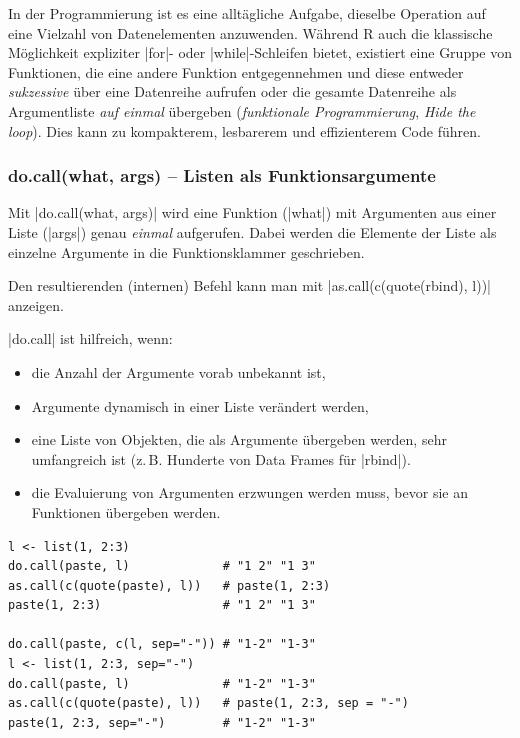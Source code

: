 \documentclass[10pt,twocolumn]{scrartcl}
\renewcommand{\lstinline}{\mycoloredinline}
\begin{document}
In der Programmierung ist es eine alltägliche Aufgabe, dieselbe Operation auf eine Vielzahl von Datenelementen anzuwenden. Während R auch die klassische Möglichkeit expliziter \lstinline|for|- oder \lstinline|while|-Schleifen bietet, existiert eine Gruppe von Funktionen, die eine andere Funktion entgegennehmen und diese entweder \emph{sukzessive} über eine Datenreihe aufrufen oder die gesamte Datenreihe als Argumentliste \emph{auf einmal} übergeben (\emph{funktionale Programmierung}, \emph{Hide the loop}). Dies kann zu kompakterem, lesbarerem und effizienterem Code führen.

\subsubsection{do.call(what, args) -- Listen als Funktionsargumente}

Mit \lstinline|do.call(what, args)| wird eine Funktion (\lstinline|what|) mit Argumenten aus einer Liste (\lstinline|args|) genau \emph{einmal} aufgerufen. Dabei werden die Elemente der Liste als einzelne Argumente in die Funktionsklammer geschrieben. 

Den resultierenden (internen) Befehl kann man mit \lstinline|as.call(c(quote(rbind), l))| anzeigen.

\lstinline|do.call| ist hilfreich, wenn:
\begin{itemize}
\item die Anzahl der Argumente vorab unbekannt ist,
\item Argumente dynamisch in einer Liste verändert werden,
\item eine Liste von Objekten, die als Argumente übergeben werden, sehr umfangreich ist (z.\,B. Hunderte von Data Frames für \lstinline|rbind|).
\item die Evaluierung von Argumenten erzwungen werden muss, bevor sie an Funktionen übergeben werden.    
\end{itemize}

\begin{lstlisting}
l <- list(1, 2:3)
do.call(paste, l)             # "1 2" "1 3"
as.call(c(quote(paste), l))   # paste(1, 2:3)
paste(1, 2:3)                 # "1 2" "1 3"

do.call(paste, c(l, sep="-")) # "1-2" "1-3"
l <- list(1, 2:3, sep="-")
do.call(paste, l)             # "1-2" "1-3"
as.call(c(quote(paste), l))   # paste(1, 2:3, sep = "-")
paste(1, 2:3, sep="-")        # "1-2" "1-3"
\end{lstlisting}
\end{document}
